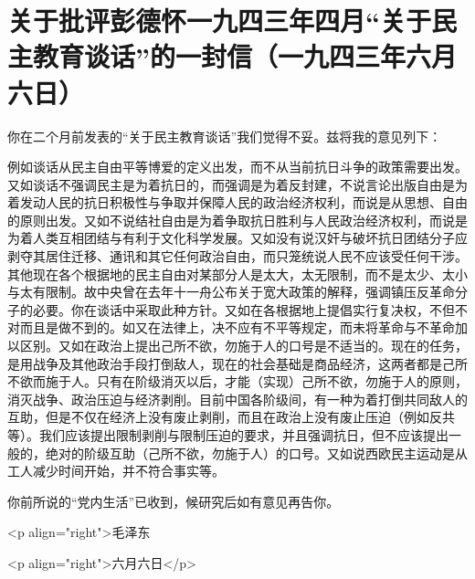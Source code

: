 \section[关于批评彭德怀一九四三年四月“关于民主教育谈话”的一封信（一九四三年六月六日）]{关于批评彭德怀一九四三年四月“关于民主教育谈话”的一封信（一九四三年六月六日）}


你在二个月前发表的“关于民主教育谈话”我们觉得不妥。兹将我的意见列下：

例如谈话从民主自由平等博爱的定义出发，而不从当前抗日斗争的政策需要出发。又如谈话不强调民主是为着抗日的，而强调是为着反封建，不说言论出版自由是为着发动人民的抗日积极性与争取并保障人民的政治经济权利，而说是从思想、自由的原则出发。又如不说结社自由是为着争取抗日胜利与人民政治经济权利，而说是为着人类互相团结与有利于文化科学发展。又如没有说汉奸与破坏抗日团结分子应剥夺其居住迁移、通讯和其它任何政治自由，而只笼统说人民不应该受任何干涉。其他现在各个根据地的民主自由对某部分人是太大，太无限制，而不是太少、太小与太有限制。故中央曾在去年十一舟公布关于宽大政策的解释，强调镇压反革命分子的必要。你在谈话中采取此种方针。又如在各根据地上提倡实行复决权，不但不对而且是做不到的。如又在法律上，决不应有不平等规定，而未将革命与不革命加以区别。又如在政治上提出己所不欲，勿施于人的口号是不适当的。现在的任务，是用战争及其他政治手段打倒敌人，现在的社会基础是商品经济，这两者都是己所不欲而施于人。只有在阶级消灭以后，才能（实现）己所不欲，勿施于人的原则，消灭战争、政治压迫与经济剥削。目前中国各阶级间，有一种为着打倒共同敌人的互助，但是不仅在经济上没有废止剥削，而且在政治上没有废止压迫（例如反共等）。我们应该提出限制剥削与限制压迫的要求，并且强调抗日，但不应该提出一般的，绝对的阶级互助（己所不欲，勿施于人）的口号。又如说西欧民主运动是从工人减少时间开始，并不符合事实等。

你前所说的“党内生活”已收到，候研究后如有意见再告你。

<p align="right">毛泽东

<p align="right">六月六日</p>

